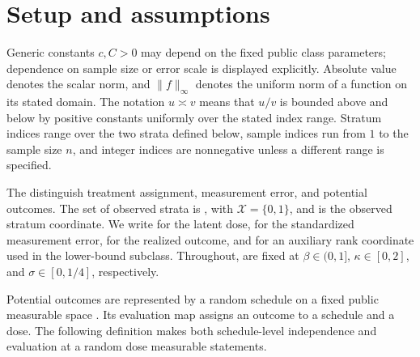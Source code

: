 \section{Setup and assumptions}

Generic constants \(c,C>0\) may depend on the fixed public class parameters; dependence on sample size or error scale is displayed explicitly. Absolute value denotes the scalar norm, and \(\|f\|_\infty\) denotes the uniform norm of a function on its stated domain. The notation \(u\asymp v\) means that \(u/v\) is bounded above and below by positive constants uniformly over the stated index range. Stratum indices range over the two strata defined below, sample indices run from \(1\) to the sample size \(n\), and integer indices are nonnegative unless a different range is specified.

The  distinguish treatment assignment, measurement error, and potential outcomes. The set of observed strata is , with \(\mathcal X=\{0,1\}\), and  is the observed stratum coordinate. We write  for the latent dose,  for the standardized measurement error,  for the realized outcome, and  for an auxiliary rank coordinate used in the lower-bound subclass. Throughout,  are fixed at \(\beta\in(0,1]\), \(\kappa\in[0,2]\), and \(\sigma\in[0,1/4]\), respectively.

Potential outcomes are represented by a random schedule on a fixed public measurable space . Its evaluation map  assigns an outcome to a schedule and a dose. The following definition makes both schedule-level independence and evaluation at a random dose measurable statements.

